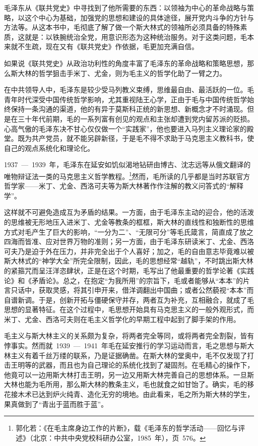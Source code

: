 毛泽东从《联共党史》中寻找到了他所需要的东西：以领袖为中心的革命战略与策略，以这个中心为基础，加强党的思想和建设的具体途径，展开党内斗争的方针与方法等。从这本书中，毛彻底了解了做一个斯大林式的领袖所必须具备的特殊素质，这就是：以铁腕统治全党，用意识形态为这种统治服务。对于这类问题，毛本来就不生疏，现在又有《联共党史》作依据，毛更加充满自信。

如果说《联共党史》从政治功利性的角度丰富了毛泽东的革命战略和策略思想，那么斯大林的哲学狙击手米丁、尤金，则为毛主义的哲学化助了一臂之力。

在中共领导人中，毛泽东是较少受马列教义束缚，思维最自由、最活跃的一位。毛青年时代深受中国传统哲学影响，尤其重视陆王心学，正由于毛与中国传统哲学始终保持一条沟通的渠道，他的有异于莫斯科正统的新思想、新概念才不时涌现。但是在三十年代前期，毛的一系列富有创见的观点和主张却遭到党内留苏派的贬损。心高气傲的毛泽东决不甘心仅仅做一个“实践家”，他也要进入马列主义理论家的殿堂。既为共产党员，就不能另辟新径，于是毛不得不求助于马克思主义教科书，使自己的观点系统化和理论化。

1937~—~1939~年，毛泽东在延安如饥似渴地钻研由博古、沈志远等从俄文翻译的唯物辩证法一类的马克思主义哲学教程。\footnote{郭化若：《在毛主席身边工作的片断》，载《毛泽东的哲学活动——回忆与评述》（北京：中共中央党校科研办公室，1985~年），页~576。}然而，毛所读的几乎都是当时苏联官方哲学家——米丁、尤金、西洛可夫等为斯大林著作作注解的教义问答式的“解释学”。

这样就不可避免造成互为矛盾的结果。一方面，由于毛泽东主动的迎合，他的活泼的思维被无形地压入进米丁、尤金等教条的框框，斯大林的直线性和独断性的思维方式对毛产生了巨大的影响，“一分为二”、“无限可分”等毛氏箴言，简直成了放之四海而皆准、应对世界万物的准则；另一方面，由于毛泽东研读米丁、尤金、西洛可夫乃是迫于外在压力，并非完全出于个人喜好；加之，毛的自由意志毕竟难以被斯大林式的“神学大全”所完全限制，因此，毛的思想经常“越轨”，不时跳出斯大林的紧箍咒而呈汪洋恣肆状，正是在这个时期，毛写出了他最重要的哲学论著《实践论》和《矛盾论》。总之，在抱定“为我所用”的宗旨下，毛或者能够从“本本”的片言只话中，获取灵感，将其引申开来，借洋调翻出中国曲；或者公然藐视“本本”而自谱新调。于是，创新开拓与僵硬保守并存，两者互为补充，互相融合，就成了毛思想的显著特征。在这个过程中，毛思想开始具有马克思主义的一般外观形式，而米丁、尤金、西洛可夫则在毛主义哲学化的早期工程中起到了脚手架的作用。

毛主义与斯大林主义的关系颇为复杂，将两者完全等同，或将两者完全割裂，皆有悖事实。然而就~1939~—~1941~年毛在延安推行的学习运动而言，毛之思想与斯大林主义有着千丝万缕的联系，乃是证据确凿。在斯大林的堂奥中，毛不仅发现了打击王明等的武器，而且也为自己理论的系统化找到了凝固剂。在毛精心的操作下，他竟可以一边用斯大林打击王明，另一边又用斯大林完善自己的思想体系。一旦斯大林也能为毛所用，那么斯大林的教条主义，毛也就食之如甘饴了。确实，毛的移花接木术已达到炉火纯青、造化无穷的境地。由此看来，毛之所为斯大林的学生，果真做到了“青出于蓝而胜于蓝”。

